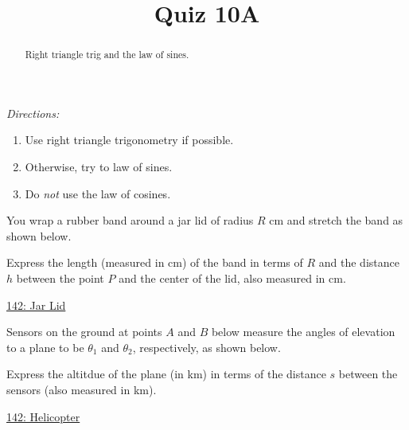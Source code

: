 \documentclass{ximera}
\title{Quiz 10A}
\begin{document}
\begin{abstract}
Right triangle trig and the law of sines.
\end{abstract}
\maketitle



\emph{Directions:}
\begin{enumerate}
\item  Use right triangle trigonometry if possible. 

\item Otherwise, try to law of sines. 

\item Do \emph{not} use the law of cosines.
\end{enumerate}

\begin{question} \label{QdfRDEfeERER}
You wrap a rubber band around a jar lid of radius $R$ cm and stretch the band as shown below.

Express the length (measured in cm) of the band in terms of $R$ and the distance $h$ between the point $P$ and the center of the lid, also measured in cm.


\begin{onlineOnly}
    \begin{center}
\end{center}
\end{onlineOnly}

\href{https://www.desmos.com/calculator/wz5qiyj4od}{142: Jar Lid}

\end{question}


\begin{question} \label{Q454ddtgHHERER}
Sensors on the ground at points $A$ and $B$ below measure the angles of elevation to a plane to be $\theta_1$ and $\theta_2$, respectively, as shown below.

Express the altitdue of the plane (in km) in terms of the distance $s$ between the sensors (also measured in km).

\begin{onlineOnly}
    \begin{center}
\end{center}
\end{onlineOnly}

\href{https://www.desmos.com/calculator/zbktegkke4}{142: Helicopter}

\end{question}
\end{document}
